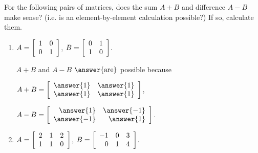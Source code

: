 \documentclass{ximera}
\author{Zack Reed}
\begin{document}
\renewenvironment{mymatrix}[1]
  {%
   \left[\begin{array}{#1}}
  {%
   \end{array}\right]}

\begin{problem}
  For the following pairs of matrices, does the sum $A+B$ and difference $A-B$ make sense? (i.e. is an element-by-element calculation possible?) If so, calculate them.
  \begin{enumerate}
  \item
    $A = \begin{mymatrix}{rr}
      1 & 0 \\
      0 & 1
    \end{mymatrix}$,\quad
    $B = \begin{mymatrix}{rr}
      0 & 1 \\
      1 & 0
    \end{mymatrix}$.

    \begin{sol}
    

      $A+B$ and $A-B$ $\answer{\text{are}}$ possible because 

      \begin{selectAll}
      \end{selectAll}

      $A+B = \begin{mymatrix}{rr}
        \answer{1} & \answer{1} \\
        \answer{1} & \answer{1}
      \end{mymatrix}$,\quad

      $A-B = \begin{mymatrix}{rr}
        \answer{1} & \answer{-1} \\
        \answer{-1} & \answer{1}
      \end{mymatrix}$.


    \end{sol}

  \item
    $A = \begin{mymatrix}{rrr}
      2 & 1 & 2 \\
      1 & 1 & 0
    \end{mymatrix}$,\quad
    $B = \begin{mymatrix}{rrr}
      -1 & 0 & 3 \\
      0 & 1 & 4
    \end{mymatrix}$.


\end{enumerate}
\end{problem}
\end{document}
